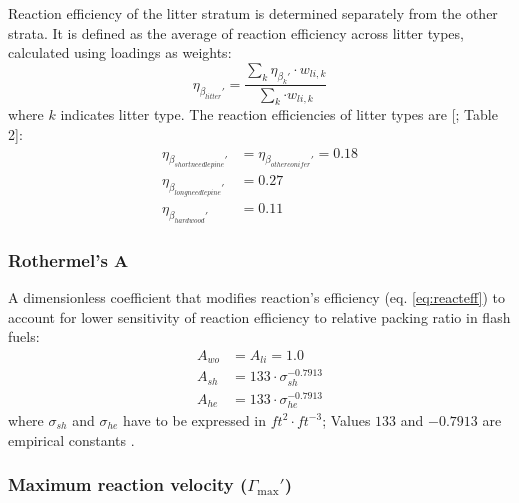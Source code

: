 \documentclass[]{book}
\begin{document}
Reaction efficiency of the litter stratum is determined separately from the other strata. It is defined as the average of reaction efficiency across litter types, calculated using loadings as weights:
\begin{equation}
\eta_{\beta_{litter}'} = \frac{\sum_{k} {\eta_{\beta_{k}'}\cdot w_{li,k}}}{\sum_{k} {\cdot w_{li,k}}}
\end{equation}
where \(k\) indicates litter type. The reaction efficiencies of litter types are {[}\citet{Prichard2013}; Table 2{]}:
\begin{eqnarray}
\eta_{\beta_{shortneedlepine}'} &= \eta_{\beta_{otherconifer}'} = 0.18\\
\eta_{\beta_{longneedlepine}'} &= 0.27\\
\eta_{\beta_{hardwood}'} &= 0.11
\end{eqnarray}

\hypertarget{rothermels-a}{%
\subsubsection{Rothermel's A}\label{rothermels-a}}

A dimensionless coefficient that modifies reaction's efficiency (eq. \eqref{eq:reacteff}) to account for lower sensitivity of reaction efficiency to relative packing ratio in flash fuels:
\begin{eqnarray}
A_{wo} &= A_{li} = 1.0\\
A_{sh} &= 133\cdot \sigma_{sh}^{-0.7913}\\
A_{he} &= 133\cdot \sigma_{he}^{-0.7913}
\end{eqnarray}
where \(\sigma_{sh}\) and \(\sigma_{he}\) have to be expressed in \(ft^2\cdot ft^{-3}\); Values \(133\) and \(-0.7913\) are empirical constants \citep{Rothermel1972}.

\hypertarget{maximum-reaction-velocity-gamma_max}{%
\subsubsection{\texorpdfstring{Maximum reaction velocity (\(\Gamma_{\max}'\))}{Maximum reaction velocity (\textbackslash{}Gamma\_\{\textbackslash{}max\}')}}\label{maximum-reaction-velocity-gamma_max}}
\end{document}
